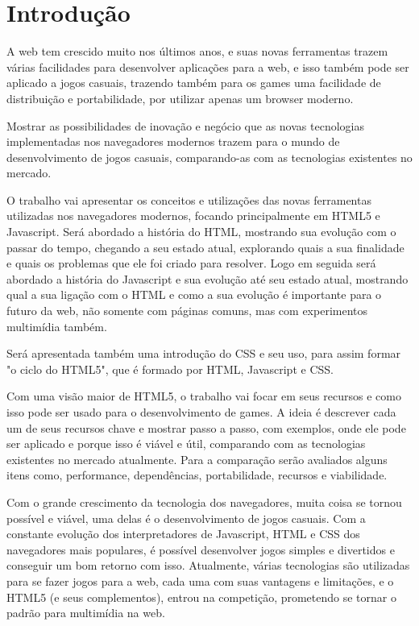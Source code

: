 \section{Introdução}

A web tem crescido muito nos últimos anos, e suas novas ferramentas trazem várias
facilidades para desenvolver aplicações para a web, e isso também pode ser aplicado
a jogos casuais, trazendo também para os games uma facilidade de distribuição e portabilidade,
por utilizar apenas um browser moderno.

Mostrar as possibilidades de inovação e negócio que as novas tecnologias implementadas
nos navegadores modernos trazem para o mundo de desenvolvimento de jogos casuais,
comparando-as com as tecnologias existentes no mercado.

O trabalho vai apresentar os conceitos e utilizações das novas ferramentas utilizadas
nos navegadores modernos, focando principalmente em HTML5 e Javascript.
Será abordado a história do HTML, mostrando sua evolução com o passar do tempo, chegando
a seu estado atual, explorando quais a sua finalidade e quais os problemas que ele foi criado para resolver.
Logo em seguida será abordado a história do Javascript e sua evolução até seu estado
atual, mostrando qual a sua ligação com o HTML e como a sua evolução é importante
para o futuro da web, não somente com páginas comuns, mas com experimentos multimídia também.

Será apresentada também uma introdução do CSS e seu uso, para assim formar "o ciclo
do HTML5", que é formado por HTML, Javascript e CSS.

Com uma visão maior de HTML5, o trabalho vai focar em seus recursos e como isso pode
ser usado para o desenvolvimento de games. A ideia é descrever cada um de seus recursos
chave e mostrar passo a passo, com exemplos, onde ele pode ser aplicado e porque isso
é viável e útil, comparando com as tecnologias existentes no mercado atualmente. Para
a comparação serão avaliados alguns itens como, performance, dependências, portabilidade, recursos e viabilidade.

Com o grande crescimento da tecnologia dos navegadores, muita coisa se tornou possível
e viável, uma delas é o desenvolvimento de jogos casuais. Com a constante evolução
dos interpretadores de Javascript, HTML e CSS dos navegadores mais populares, é possível
desenvolver jogos simples e divertidos e conseguir um bom retorno com isso. Atualmente,
várias tecnologias são utilizadas para se fazer jogos para a web, cada uma com suas
vantagens e limitações, e o HTML5 (e seus complementos), entrou na competição, prometendo
se tornar o padrão para multimídia na web.


